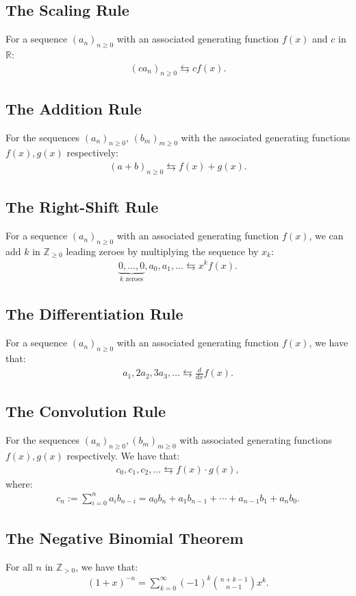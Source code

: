 \subsection{The Scaling Rule}

For a sequence $(a_n)_{n \geq 0}$ with an
associated generating function $f(x)$ and $c$ in $\mathbb{R}$: \begin{gather*}
  (ca_n)_{n \geq 0} \leftrightarrows cf(x).
\end{gather*}

\subsection{The Addition Rule}

For the sequences $(a_n)_{n \geq 0}$, $(b_m)_{m \geq 0}$ 
with the associated generating functions $f(x), g(x)$ respectively: \begin{gather*}
  (a + b)_{n \geq 0} \leftrightarrows f(x) + g(x).
\end{gather*}

\subsection{The Right-Shift Rule}

For a sequence $(a_n)_{n \geq 0}$ with an associated generating 
function $f(x)$, we can add $k$ in $\mathbb{Z}_{\geq 0}$ leading zeroes by
multiplying the sequence by $x_k$: \begin{gather*}
  \underbrace{0, \ldots, 0}_\text{$k$ zeroes}, a_0, a_1, \ldots \leftrightarrows x^kf(x).
\end{gather*}

\subsection{The Differentiation Rule}

For a sequence $(a_n)_{n \geq 0}$ with an associated generating 
function $f(x)$, we have that: \begin{gather*}
  a_1, 2a_2, 3a_3, \ldots \leftrightarrows \frac{d}{dx}f(x).
\end{gather*}

\subsection{The Convolution Rule}

For the sequences $(a_n)_{n \geq 0}, (b_m)_{m \geq 0}$ with 
associated generating functions $f(x), g(x)$ respectively.
We have that: \begin{gather*}
  c_0, c_1, c_2, \ldots \leftrightarrows f(x) \cdot g(x),
\end{gather*} where: \begin{gather*}
  c_n := \sum_{i = 0}^{n} a_ib_{n - i} = a_0b_n + a_1b_{n-1} 
  + \cdots + a_{n-1}b_1 + a_nb_0.
\end{gather*}

\subsection{The Negative Binomial Theorem}

For all $n$ in $\mathbb{Z}_{> 0}$, we have that: \begin{gather*}
  (1 + x)^{-n} = \sum_{k = 0}^\infty (-1)^k\binom{n + k - 1}{n - 1}x^k.
\end{gather*}